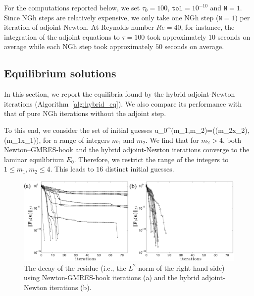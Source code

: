 \documentclass{jfm}
\begin{document}
For the computations reported below, we set $\tau_0=100$, $\texttt{tol}=10^{-10}$ and
$\texttt{N}=1$. Since NGh steps are relatively expensive, we only take one NGh step
($\texttt{N}=1$) per iteration of
adjoint-Newton.
At Reynolds number $Re=40$, for instance, the integration of the adjoint equations
to $\tau=100$
took approximately $10$ seconds on average while each NGh step took approximately $50$ seconds
on average.

\subsection{Equilibrium solutions}
In this section, we report the equilibria found by the hybrid adjoint-Newton iterations
(Algorithm~\ref{alg:hybrid_eq}).
We also compare its performance with that of pure NGh iterations without the
adjoint step.

To this end, we consider the set of initial guesses
\beq
\vc u_0^{(m_1,m_2)}=\big(\cos(m_2x_2),\cos(m_1x_1)\big),
\label{eq:ig}
\eeq
for a range of integers $m_1$ and $m_2$. We find that for $m_2>4$, both Newton--GMRES-hook
and the hybrid adjoint-Newton iterations converge to the laminar equilibrium $E_0$. Therefore, we
restrict the range of the integers to $1\leq m_1,m_2\leq 4$. This leads to $16$ distinct
initial guesses.
%
\begin{figure}
\centering
\includegraphics[width=\textwidth]{R40_error}
\caption{The decay of the residue (i.e., the $L^2$-norm of the right hand side) using
Newton-GMRES-hook iterations (a) and the hybrid
adjoint-Newton iterations (b).}
\label{fig:NGh_vs_adjN}
\end{figure}
\end{document}
